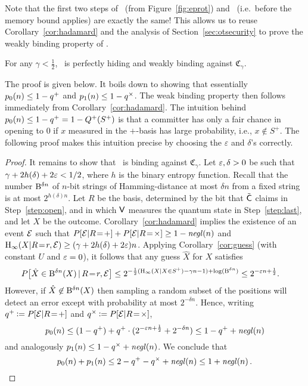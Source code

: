 Note that the first two steps of \eprqot\ (from
Figure~\ref{fig:eprot}) and \eprcomm\ (i.e.~before the memory bound applies) are exactly the
same!  This allows us to reuse Corollary~\ref{cor:hadamard} and the
analysis of Section~\ref{sec:otsecurity} to prove the weakly binding
property of \eprcomm.
\begin{theorem}\label{thm:weakbinding}
For any $\gamma<\frac{1}{2}$,
\comm\ is perfectly hiding and weakly binding against $\mathfrak{C}_{\gamma}$.  
\end{theorem}
The proof is given below. It boils down to showing that essentially
$p_0(n) \leq 1 - q^{+}$ and $p_1(n) \leq 1 - q^{\times}$. The weak binding property
then follows immediately from Corollary~\ref{cor:hadamard}. The
intuition behind $p_0(n) \leq 1 - q^{+} = 1 - Q^{+}(S^+)$ is that a committer has only a
fair chance in opening to $0$ if $x$ measured in the $+$-basis has large
probability, i.e., $x \not\in S^+$. The following proof makes this
intuition precise by choosing the $\varepsilon$ and $\delta$'s
correctly.
\begin{proof}
  It remains to show that \eprcomm\ is binding against
  $\mathfrak{C}_{\gamma}$. Let $\varepsilon, \delta > 0$ be such that $\gamma
  + 2h(\delta) + 2\varepsilon < 1/2$, where $h$ is the binary entropy
  function. Recall that the number ${\mathrm{B}}^{\delta n}$ of $n$-bit strings of Hamming-distance at
  most $\delta n$ from a fixed string is at most $2^{h(\delta) n}$. Let
  $R$ be the basis, determined by the bit that $\tilde{\sf C}$ claims in
  Step~\ref{step:open}, and in which ${\sf V}$ measures the quantum state
  in Step~\ref{step:last}, and let $X$ be the outcome.
  Corollary~\ref{cor:hadamard} implies the existence of an event $\cal
  E$ such that $P[\mathcal{E}|R\!=\!+] + P[\mathcal{E}|R\!=\!\times] \geq 1 -
  \mathit{negl}({n})$ and $\operatorname{H}_{\infty}(X|R\!=\!r,\mathcal{E}) \geq (\gamma+2h(\delta) +
  2\varepsilon) n$. Applying Corollary~\ref{cor:guess} (with constant $U$ and
  $\varepsilon=0$), it follows that any guess $\hat{X}$ for $X$ satisfies
\begin{align*}
P\big[ \hat{X} \in {\mathrm{B}}^{\delta n}(X) \,|\, R\!=\!r,\mathcal{E} \big]
 &\leq 2^{-\frac{1}{2} (\operatorname{H}_{\infty}(X|X \in S^+)-\gamma n-1) + \log({\mathrm{B}}^{\delta
 n}) } \leq 2^{-\varepsilon n + \frac{1}{2}}.
\end{align*}
However, if $\hat{X} \not\in {\mathrm{B}}^{\delta n}(X)$ then sampling a
random subset of the positions will detect an error except with
probability at most $2^{-\delta n}$. Hence, writing $\qp \assign
\P[\ev|R\!=\!+]$ and $\qt \assign \P[\ev|R\!=\!\times]$,
$$
p_0(n) \leq (1-q^{+}) + q^{+}\cdot (2^{-\varepsilon n + \frac12} + 2^{-\delta
  n}) \leq 1-q^{+} + \mathit{negl}({n})
$$
and analogously $p_1(n) \leq 1-q^{\times} + \mathit{negl}({n}) $. We conclude that
$$
p_0(n) + p_1(n) \leq  2 - q^{+} - q^{\times} + \mathit{negl}({n}) \leq  1+ \mathit{negl}({n}) \, .
$$
\end{proof}


